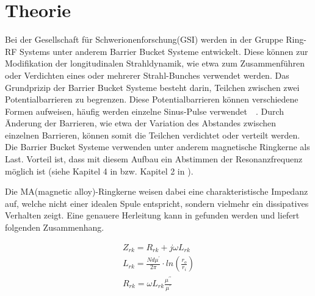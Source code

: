 \section{Theorie}

Bei der Gesellschaft für Schwerionenforschung(GSI) werden in der Gruppe Ring-RF Systems unter anderem  Barrier Bucket Systeme entwickelt. Diese können zur Modifikation der longitudinalen Strahldynamik, wie etwa zum Zusammenf\"uhren oder Verdichten eines oder mehrerer Strahl-Bunches verwendet werden. 
Das Grundprizip der Barrier Bucket Systeme besteht darin, Teilchen zwischen zwei Potentialbarrieren zu begrenzen. Diese Potentialbarrieren k\"onnen verschiedene Formen aufweisen, h\"aufig werden einzelne Sinus-Pulse verwendet~\citep{harzheim2016modeling}~\citep{lee1997particle}. Durch \"Anderung der Barrieren, wie etwa der Variation des Abstandes zwischen einzelnen Barrieren, k\"onnen somit die Teilchen verdichtet oder verteilt werden.
Die Barrier Bucket Systeme verwenden unter anderem magnetische Ringkerne als Last. Vorteil ist, dass mit diesem Aufbau ein Abstimmen der Resonanzfrequenz m\"oglich ist (siehe Kapitel 4 in \citep{Klingbeil2015} bzw. Kapitel 2 in \citep{bast2017ba}).
\par
Die MA(magnetic alloy)-Ringkerne weisen dabei eine charakteristische Impedanz auf, welche nicht einer idealen Spule entspricht, sondern vielmehr ein dissipatives Verhalten zeigt. Eine genauere Herleitung kann in \citep{Klingbeil2015} gefunden werden und liefert folgenden Zusammenhang. 


\begin{align}
Z_{rk} = R_{rk} + j\omega L_{rk}\label{eq_01}\\
L_{rk} = \frac{Nd\mu^\prime}{2\pi}\cdot ln(\frac{r_o}{r_i})\label{eq_02}\\
R_{rk} = \omega L_{rk} \frac{\mu^{\prime\prime}}{\mu^{\prime}}\label{eq_03}
\end{align}



